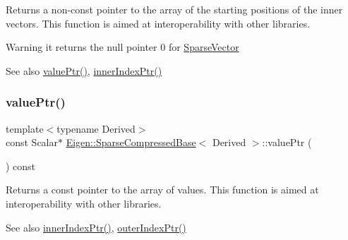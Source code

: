 \begin{DoxyReturn}{Returns}
a non-\/const pointer to the array of the starting positions of the inner vectors. This function is aimed at interoperability with other libraries. 
\end{DoxyReturn}
\begin{DoxyWarning}{Warning}
it returns the null pointer 0 for \mbox{\hyperlink{class_eigen_1_1_sparse_vector}{Sparse\+Vector}} 
\end{DoxyWarning}
\begin{DoxySeeAlso}{See also}
\mbox{\hyperlink{class_eigen_1_1_sparse_compressed_base_a0f12f72d14b6c277d09be9f5ce2eab95}{value\+Ptr()}}, \mbox{\hyperlink{class_eigen_1_1_sparse_compressed_base_a197111c1289644f1ea38fe683ccdd82a}{inner\+Index\+Ptr()}} 
\end{DoxySeeAlso}
\mbox{\label{class_eigen_1_1_sparse_compressed_base_a0f44c739398794ea77f310b745cc5627}} 
\subsubsection{\texorpdfstring{valuePtr()}{valuePtr()}\hspace{0.1cm}{\footnotesize\ttfamily [1/2]}}
{\footnotesize\ttfamily template$<$typename Derived$>$ \\
const Scalar$\ast$ \mbox{\hyperlink{class_eigen_1_1_sparse_compressed_base}{Eigen\+::\+Sparse\+Compressed\+Base}}$<$ Derived $>$\+::value\+Ptr (\begin{DoxyParamCaption}{ }\end{DoxyParamCaption}) const\hspace{0.3cm}{\ttfamily [inline]}}

\begin{DoxyReturn}{Returns}
a const pointer to the array of values. This function is aimed at interoperability with other libraries. 
\end{DoxyReturn}
\begin{DoxySeeAlso}{See also}
\mbox{\hyperlink{class_eigen_1_1_sparse_compressed_base_a197111c1289644f1ea38fe683ccdd82a}{inner\+Index\+Ptr()}}, \mbox{\hyperlink{class_eigen_1_1_sparse_compressed_base_a53a82f962686e18c8dc07a4b9a85ed7b}{outer\+Index\+Ptr()}} 
\end{DoxySeeAlso}
\mbox{\label{class_eigen_1_1_sparse_compressed_base_a0f12f72d14b6c277d09be9f5ce2eab95}} 
